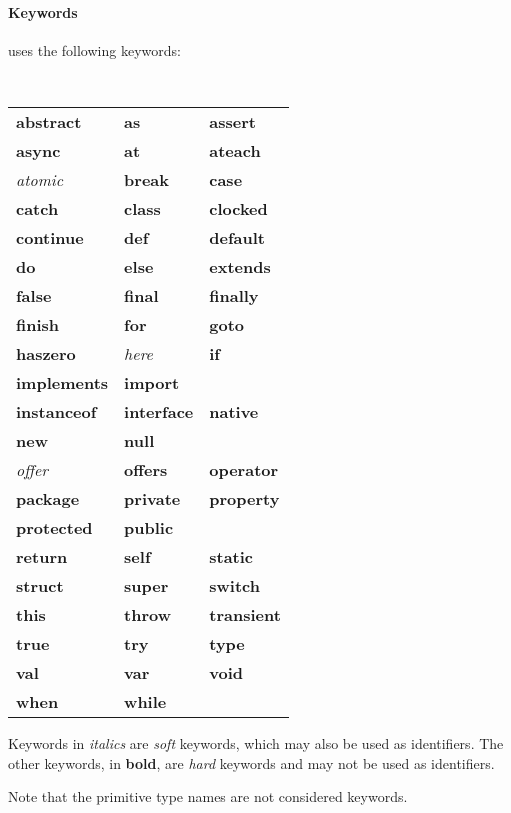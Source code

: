 \paragraph{Keywords}
\Xten{} uses the following keywords:\\
{\tt 
\begin{tabular}{lll}
    {\bf abstract} &
    {\bf as}&
    {\bf assert}\\
    {\bf async}&
    {\bf at}&
    {\bf ateach}\\
    {\it atomic}&
    {\bf break}&
    {\bf case}\\
    {\bf catch}&
    {\bf class}&
    {\bf clocked}\\
    {\bf continue}&
    {\bf def}&
    {\bf default}\\
    {\bf do}&
    {\bf else}&
    {\bf extends}\\
    {\bf false}&
    {\bf final}&
    {\bf finally}\\
    {\bf finish}&
    {\bf for}&
    {\bf goto}\\
    {\bf haszero}&
    {\it here}&
    {\bf if}\\
    {\bf implements}&
    {\bf import}&
    {\bf }\\
    {\bf instanceof}&
    {\bf interface}&
    {\bf native}\\
    {\bf new}&
    {\bf null}\\
    {\it offer}&
    {\bf offers}&
    {\bf operator}\\
    {\bf package}&
    {\bf private}&
    {\bf property}\\
    {\bf protected}&
    {\bf public}\\
    {\bf return}&
    {\bf self}&
    {\bf static}\\
    {\bf struct}&
    {\bf super}&
    {\bf switch}\\
    {\bf this}&
    {\bf throw}&
    {\bf transient}\\
    {\bf true}&
    {\bf try}&
    {\bf type}\\
    {\bf val}&
    {\bf var}&
    {\bf void}\\
    {\bf when}& 
    {\bf while}&
\end{tabular}
}

Keywords in {\em italics} are {\em soft} keywords, which may also be
used as identifiers.  The other keywords, in {\bf bold}, are {\em hard}
keywords and  may not be used as identifiers.

Note that the primitive type names are not considered keywords.


